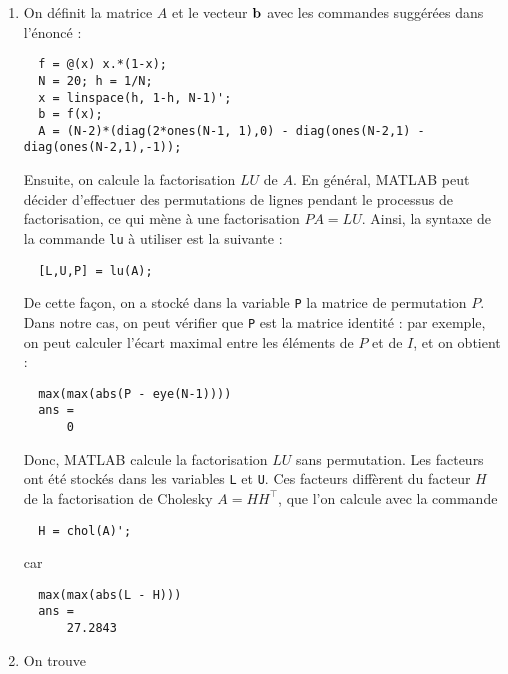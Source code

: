 \begin{enumerate}[label=\alph*)]
  \item On définit la matrice $A$ et le vecteur $\mathbf{b}$ avec les commandes suggérées dans l'énoncé :
  
\begin{verbatim}
  f = @(x) x.*(1-x);
  N = 20; h = 1/N;
  x = linspace(h, 1-h, N-1)'; 
  b = f(x);
  A = (N-2)*(diag(2*ones(N-1, 1),0) - diag(ones(N-2,1) - diag(ones(N-2,1),-1));
\end{verbatim}
        
        Ensuite, on calcule la factorisation $LU$ de $A$.
        En général, \textsc{MATLAB} peut décider d'effectuer des permutations de lignes pendant le processus de factorisation, ce qui mène à une factorisation $PA = LU$.
        Ainsi, la syntaxe de la commande \texttt{lu} à utiliser est la suivante :
        
\begin{verbatim}
  [L,U,P] = lu(A);
\end{verbatim}
        
        De cette façon, on a stocké dans la variable \texttt{P} la matrice de permutation $P$.
        Dans notre cas, on peut vérifier que \texttt{P} est la matrice identité : par exemple, on peut calculer l'écart maximal entre les éléments de $P$ et de $I$, et on obtient :
  
\begin{verbatim}
  max(max(abs(P - eye(N-1))))
  ans =
      0
\end{verbatim}
        
        Donc, \textsc{MATLAB} calcule la factorisation $LU$ sans permutation.
        Les facteurs ont été stockés dans les variables \texttt{L} et \texttt{U}.
        Ces facteurs diffèrent du facteur $H$ de la factorisation de Cholesky $A = H H^{\top}$, que l'on calcule avec la commande
  
\begin{verbatim}
  H = chol(A)';
\end{verbatim}
        
        car
        
\begin{verbatim}
  max(max(abs(L - H)))
  ans =
      27.2843
\end{verbatim}
        
  \item On trouve
  
        
        
        

\end{enumerate}
